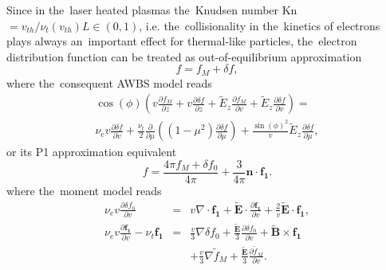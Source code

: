 \documentclass[preprint,12pt]{elsarticle}
\newcommand{\pdv}[2]{\frac{\partial{#1}}{\partial{#2}}}
\newcommand{\vect}[1]{\boldsymbol{#1}}
\newcommand{\nue}{\nu_{e}}
\newcommand{\nutot}{\nu_{t}}
\newcommand{\vmag}{v}
\newcommand{\vth}{v_{th}}
\newcommand{\vn}{\vect{n}}
\newcommand{\tE}{\vect{\tilde{E}}}
\newcommand{\tEz}{\tilde{E}_z}
\newcommand{\tB}{\vect{\tilde{B}}}
\newcommand{\fM}{f_M}
\newcommand{\tfM}{\tilde{f}_M}
\newcommand{\daf}{\delta f}
\newcommand{\dafzero}{\delta f_0}
\newcommand{\fone}{\vect{f_1}}
\newcounter{bla}
\begin{document}
Since in the~laser heated plasmas the~Knudsen number 
Kn$ = \vth/\nu_t(\vth) L \in (0, 1)$, i.e. the~collisionality in 
the~kinetics of electrons plays always an~important effect for thermal-like 
particles, the~electron distribution 
function can be treated as out-of-equilibrium approximation 
\begin{equation}
  f = \fM + \daf ,
  \label{eq:OOE_outofeq}
\end{equation}  
where the~consequent AWBS model reads
\begin{multline}
  \cos(\phi) \left(\vmag\pdv{\fM}{z} + \vmag\pdv{\daf}{z} 
  + \tEz\pdv{\fM}{\vmag} + \tEz\pdv{\daf}{\vmag} \right)  
  =\\
  \nue\vmag\pdv{\daf}{\vmag} 
  + \frac{\nu_t}{2}
  \pdv{}{\mu}\left((1 - \mu^2)\pdv{\daf}{\mu}\right) 
  + \frac{\sin(\phi)^2}{\vmag} \tEz \pdv{\daf}{\mu} ,
  \label{eq:OOE_AWBS_simple}
\end{multline}
or its P1 approximation equivalent
\begin{equation}
  f = \frac{4\pi \fM + \dafzero}{4\pi} + \frac{3}{4\pi}\vn\cdot\fone .
  \label{eq:OOE_P1outofeq}
\end{equation}
where the~moment model reads
\begin{eqnarray}
  \nue\vmag\pdv{\dafzero}{\vmag} &=&
  \vmag\nabla\cdot\fone + \tE\cdot
  \pdv{\fone}{\vmag} + \frac{2}{\vmag}\tE\cdot\fone , 
  \label{eq:OOE_P1f0}\\
  \nue\vmag\pdv{\fone}{\vmag} - \nutot\fone &=& 
  \frac{\vmag}{3}\nabla\dafzero + 
  \frac{\tE}{3}\pdv{\dafzero}{\vmag} + \tB\times\fone 
  \nonumber \\
  & & + \frac{\vmag}{3}\nabla\tfM + \frac{\tE}{3}\pdv{\tfM}{\vmag} .
  \label{eq:OOE_P1f1}
\end{eqnarray}
\end{document}
